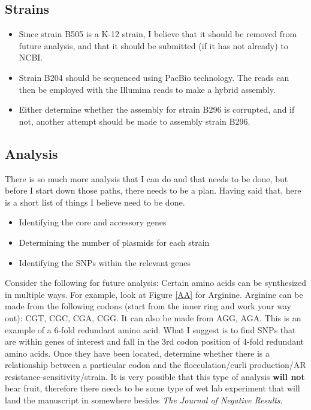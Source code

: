 \documentclass[11pt]{article}
\begin{document}
\subsection*{Strains}
\begin{itemize}
\item Since strain B505 is a K-12 strain, I believe that it should be removed from future analysis, and that it should be submitted (if it has not already) to NCBI. 
\item Strain B204 should be sequenced using PacBio technology. The reads can then be employed with the Illumina reads to make a hybrid assembly.
\item Either determine whether the assembly for strain B296 is corrupted, and if not, another attempt should be made to assembly strain B296.
\end{itemize}

\subsection*{Analysis}
There is so much more analysis that I can do and that needs to be done, but before I start down those paths, there needs to be a plan. Having said that, here is a short list of things I believe need to be done.

\begin{itemize}
\item Identifying the core and accessory genes
\item Determining the number of plasmids for each strain
\item Identifying the SNPs within the relevant genes
\end{itemize}

Consider the following for future analysis: Certain amino acids can be synthesized in multiple ways. For example, look at Figure \ref{AA} for Arginine. Arginine can be made from the following codons (start from the inner ring and work your way out): CGT, CGC, CGA, CGG. It can also be made from AGG, AGA. This is an example of a 6-fold redundant amino acid. What I suggest is to find SNPs that are within genes of interest and fall in the 3rd codon position of 4-fold redundant amino acids. Once they have been located, determine whether there is a relationship between a particular codon and the flocculation/curli production/AR resistance-sensitivity/strain. It is very possible that this type of analysis \textbf{will not} bear fruit, therefore there needs to be some type of wet lab experiment that will land the manuscript in somewhere besides \textit{The Journal of Negative Results}.
\end{document}
